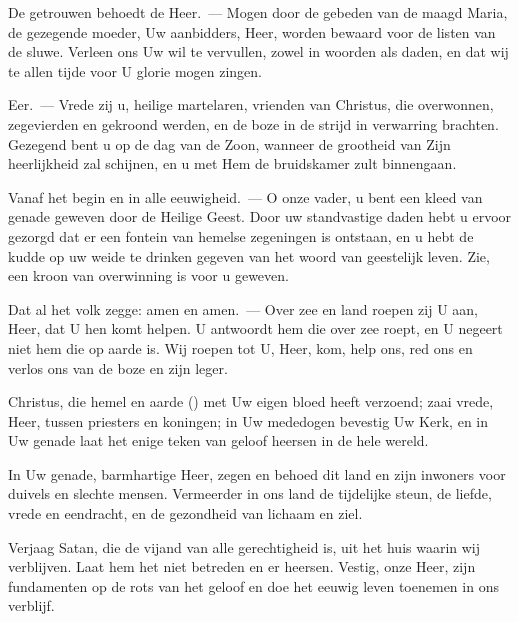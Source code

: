 \documentclass[12pt,twoside,a5paper]{article}
\begin{document}
\begin{halfparskip}
  De getrouwen behoedt de Heer.~--- Mogen door de gebeden van de maagd Maria, de gezegende moeder, Uw aanbidders, Heer, worden bewaard voor de listen van de sluwe. Verleen ons Uw wil te vervullen, zowel in woorden als daden, en dat wij te allen tijde voor U glorie mogen zingen.

  Eer.~--- Vrede zij u, heilige martelaren, vrienden van Christus, die overwonnen, zegevierden en gekroond werden, en de boze in de strijd in verwarring brachten. Gezegend bent u op de dag van de Zoon, wanneer de grootheid van Zijn heerlijkheid zal schijnen, en u met Hem de bruidskamer zult binnengaan.

  Vanaf het begin en in alle eeuwigheid.~--- O onze vader, u bent een kleed van genade geweven door de Heilige Geest. Door uw standvastige daden hebt u ervoor gezorgd dat er een fontein van hemelse zegeningen is ontstaan, en u hebt de kudde op uw weide te drinken gegeven van het woord van geestelijk leven. Zie, een kroon van overwinning is voor u geweven.

  Dat al het volk zegge: amen en amen.~--- Over zee en land roepen zij U aan, Heer, dat U hen komt helpen. U antwoordt hem die over zee roept, en U negeert niet hem die op aarde is. Wij roepen tot U, Heer, kom, help ons, red ons en verlos ons van de boze en zijn leger.

  Christus, die hemel en aarde () met Uw eigen bloed heeft verzoend; zaai vrede, Heer, tussen priesters en koningen; in Uw mededogen bevestig Uw Kerk, en in Uw genade laat het enige teken van geloof heersen in de hele wereld.

  In Uw genade, barmhartige Heer, zegen en behoed dit land en zijn inwoners voor duivels en slechte mensen. Vermeerder in ons land de tijdelijke steun, de liefde, vrede en eendracht, en de gezondheid van lichaam en ziel.

  Verjaag Satan, die de vijand van alle gerechtigheid is, uit het huis waarin wij verblijven. Laat hem het niet betreden en er heersen. Vestig, onze Heer, zijn fundamenten op de rots van het geloof en doe het eeuwig leven toenemen in ons verblijf.
\end{halfparskip}
\end{document}
